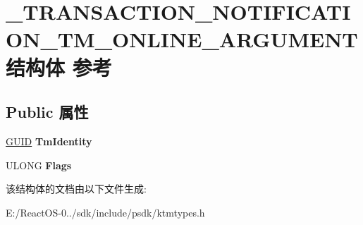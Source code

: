 \hypertarget{struct___t_r_a_n_s_a_c_t_i_o_n___n_o_t_i_f_i_c_a_t_i_o_n___t_m___o_n_l_i_n_e___a_r_g_u_m_e_n_t}{}\section{\+\_\+\+T\+R\+A\+N\+S\+A\+C\+T\+I\+O\+N\+\_\+\+N\+O\+T\+I\+F\+I\+C\+A\+T\+I\+O\+N\+\_\+\+T\+M\+\_\+\+O\+N\+L\+I\+N\+E\+\_\+\+A\+R\+G\+U\+M\+E\+N\+T结构体 参考}
\label{struct___t_r_a_n_s_a_c_t_i_o_n___n_o_t_i_f_i_c_a_t_i_o_n___t_m___o_n_l_i_n_e___a_r_g_u_m_e_n_t}
\subsection*{Public 属性}
\begin{DoxyCompactItemize}
\item 
\mbox{\label{struct___t_r_a_n_s_a_c_t_i_o_n___n_o_t_i_f_i_c_a_t_i_o_n___t_m___o_n_l_i_n_e___a_r_g_u_m_e_n_t_ad28bee4ac9740ae2668b9231007a6c0b}} 
\hyperlink{interface_g_u_i_d}{G\+U\+ID} {\bfseries Tm\+Identity}
\item 
\mbox{\label{struct___t_r_a_n_s_a_c_t_i_o_n___n_o_t_i_f_i_c_a_t_i_o_n___t_m___o_n_l_i_n_e___a_r_g_u_m_e_n_t_a048de7420bdde1dd6edd630a8c9ba0c4}} 
U\+L\+O\+NG {\bfseries Flags}
\end{DoxyCompactItemize}


该结构体的文档由以下文件生成\+:\begin{DoxyCompactItemize}
\item 
E\+:/\+React\+O\+S-\/0../sdk/include/psdk/ktmtypes.\+h\end{DoxyCompactItemize}
